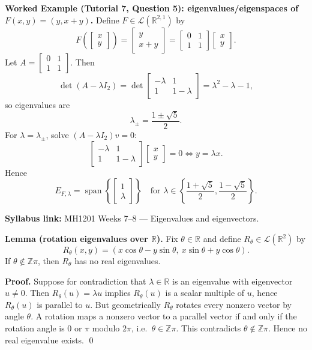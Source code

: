 \begin{examplebox}
\textbf{Worked Example (Tutorial 7, Question 5): eigenvalues/eigenspaces of $F(x,y)=(y,x+y)$.}
Define $F\in\mathcal{L}(\mathbb{R}^{2,1})$ by
\[
F\!\left(\begin{bmatrix}x\\y\end{bmatrix}\right)=\begin{bmatrix}y\\x+y\end{bmatrix}
=\begin{bmatrix}0&1\\1&1\end{bmatrix}\begin{bmatrix}x\\y\end{bmatrix}.
\]
Let $A=\begin{bmatrix}0&1\\1&1\end{bmatrix}$. Then
\[
\det(A-\lambda I_2)=\det\begin{bmatrix}-\lambda&1\\1&1-\lambda\end{bmatrix}=\lambda^2-\lambda-1,
\]
so eigenvalues are
\[
\lambda_{\pm}=\frac{1\pm\sqrt{5}}{2}.
\]
For $\lambda=\lambda_{\pm}$, solve $(A-\lambda I_2)v=0$:
\[
\begin{bmatrix}-\lambda&1\\1&1-\lambda\end{bmatrix}\begin{bmatrix}x\\y\end{bmatrix}=0
\Longleftrightarrow y=\lambda x.
\]
Hence
\[
E_{F,\lambda}=\operatorname{span}\left\{\begin{bmatrix}1\\ \lambda\end{bmatrix}\right\}
\quad\text{for }\lambda\in\left\{\frac{1+\sqrt5}{2},\frac{1-\sqrt5}{2}\right\}.
\]
\end{examplebox}

\begin{extension}[title={Extension (Tutorial 7, Question 4, Method 2)}]
\textbf{Syllabus link:} MH1201 Weeks 7--8 — Eigenvalues and eigenvectors.

\textbf{Lemma (rotation eigenvalues over $\mathbb{R}$).}
Fix $\theta\in\mathbb{R}$ and define $R_\theta\in\mathcal{L}(\mathbb{R}^2)$ by
\[
R_\theta(x,y)=(x\cos\theta-y\sin\theta,\ x\sin\theta+y\cos\theta).
\]
If $\theta\notin\mathbb{Z}\pi$, then $R_\theta$ has no real eigenvalues.

\textbf{Proof.}
Suppose for contradiction that $\lambda\in\mathbb{R}$ is an eigenvalue with eigenvector $u\neq 0$.
Then $R_\theta(u)=\lambda u$ implies $R_\theta(u)$ is a scalar multiple of $u$, hence $R_\theta(u)$ is parallel to $u$.
But geometrically $R_\theta$ rotates every nonzero vector by angle $\theta$.
A rotation maps a nonzero vector to a parallel vector if and only if the rotation angle is $0$ or $\pi$ modulo $2\pi$,
i.e.\ $\theta\in\mathbb{Z}\pi$. This contradicts $\theta\notin\mathbb{Z}\pi$.
Hence no real eigenvalue exists. \qed
\end{extension}

